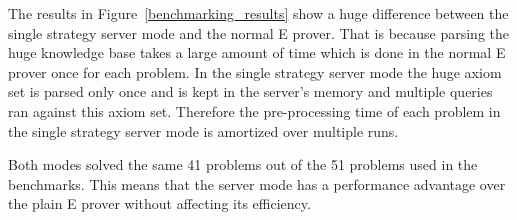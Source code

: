 The results in Figure~\ref{benchmarking_results} show a huge difference between the single strategy server mode and the normal E prover. That is because parsing the huge knowledge base takes a large amount of time which is done in the normal E prover once for each problem. In the single strategy server mode the huge axiom set is parsed only once and is kept in the server's memory and multiple queries ran against this axiom set. Therefore the pre-processing time of each problem in the single strategy server mode is amortized over multiple runs.

Both modes solved the same 41 problems out of the 51 problems used in the benchmarks. This means that the server mode has a performance advantage over the plain E prover without affecting its efficiency.
